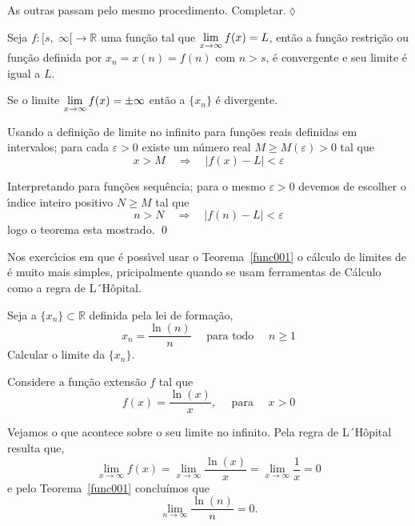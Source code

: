 As outras \seqs passam pelo mesmo procedimento. Completar.\hfill \(\lozenge\)


\begin{fteo}\label{func001}
Seja $f\colon [s,\;\infty[\to \mathbb{R}$ uma fun\c{c}\~{a}o tal que $\displaystyle{\lim_{x\to\infty} f(x)=L}$, ent\~{a}o a fun\c{c}\~{a}o restri\c{c}\~{a}o ou fun\c{c}\~{a}o \seq definida por $x_n=x(n)=f(n)$ com $n>s$, \'{e} convergente e seu limite \'{e} igual a $L$.

Se o limite $\displaystyle{\lim_{x\to\infty} f(x)=\pm \infty}$ ent\~{a}o a \seq $\{x_n\}$ \'{e} divergente.
\end{fteo}

\prova Usando a defini\c{c}\~{a}o de limite no infinito para fun\c{c}\~{o}es reais definidas em intervalos; para cada $\varepsilon>0$ existe um n\'{u}mero real $M \ge M(\varepsilon)>0$ tal que
\begin{equation*}
    x>M\quad \Rightarrow\quad |f(x)-L|<\varepsilon
\end{equation*}

Interpretando para fun\c{c}\~{o}es sequ\^{e}ncia; para o mesmo $\varepsilon>0$ devemos de escolher o \'{\i}ndice inteiro positivo $N\geq M$ tal que
\begin{equation*}
   n>N\quad \Rightarrow\quad |f(n)-L|<\varepsilon
\end{equation*}
logo o teorema esta mostrado. \qed


\begin{note}
Nos exerc\'{\i}cios em que \'{e} poss\'{\i}vel usar o Teorema~\ref{func001} o c\'{a}lculo de limites de \seqs \'{e} muito mais simples, pricipalmente quando se usam ferramentas de C\'{a}lculo como a regra de L´H\^{o}pital.
\end{note}

\begin{exer}
Seja a \seq $\{x_n\}\subset \mathbb{R}$ definida pela lei de forma\c{c}\~{a}o,
\begin{equation*}
    x_n=\frac{\ln(n)}{n}\quad \text{ para todo }\quad n\geq 1
\end{equation*}
Calcular o limite da \seq $\{x_n\}$.
\end{exer}

\solo Considere a fun\c{c}\~{a}o extens\~{a}o $f$ tal que
\begin{equation*}
    f(x)=\dfrac{\ln(x)}{x},\quad \text{ para } \quad x>0
\end{equation*}

Vejamos o que acontece sobre o seu limite no infinito. Pela regra de L´H\^{o}pital resulta que,
\begin{equation*}
    \lim_{x\to \infty}f(x)=\lim_{x\to \infty}\dfrac{\ln(x)}{x}=\lim_{x\to \infty}\frac{1}{x}=0
\end{equation*}
e pelo Teorema~\ref{func001} concluímos que
\begin{equation*}
    \lim_{n\to \infty}\frac{\ln(n)}{n}=0.
\end{equation*}

